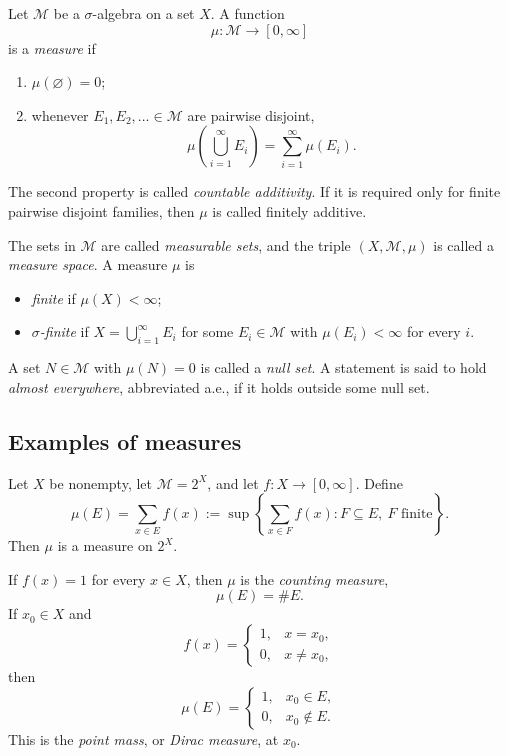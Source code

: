 \begin{definition}[Measure]
  Let $\mathcal M$ be a $\sigma$-algebra on a set $X$. A function
  \[
    \mu\colon\mathcal M\longrightarrow[0,\infty]
  \]
  is a \emph{measure} if
  \begin{enumerate}[label=(\roman*)]
    \item $\mu(\varnothing)=0$;
    \item whenever $E_1,E_2,\ldots\in\mathcal M$ are pairwise disjoint,
      \[
        \mu\left(\bigcup_{i=1}^{\infty}E_i\right)
        =\sum_{i=1}^{\infty}\mu(E_i).
      \]
  \end{enumerate}
  The second property is called \emph{countable additivity}. If it is
  required only for finite pairwise disjoint families, then $\mu$ is
  called finitely additive.
\end{definition}

The sets in $\mathcal M$ are called \emph{measurable sets}, and the
triple $(X,\mathcal M,\mu)$ is called a \emph{measure space}. A measure
$\mu$ is
\begin{itemize}
  \item \emph{finite} if $\mu(X)<\infty$;
  \item \emph{$\sigma$-finite} if
    $X=\bigcup_{i=1}^{\infty}E_i$ for some $E_i\in\mathcal M$ with
    $\mu(E_i)<\infty$ for every $i$.
\end{itemize}

A set $N\in\mathcal M$ with $\mu(N)=0$ is called a \emph{null set}. A
statement is said to hold \emph{almost everywhere}, abbreviated a.e., if
it holds outside some null set.

\subsection{Examples of measures}

\begin{example}
  Let $X$ be nonempty, let $\mathcal M=2^X$, and let
  $f\colon X\to[0,\infty]$. Define
  \[
    \mu(E)=\sum_{x\in E}f(x)
    :=\sup\left\{
      \sum_{x\in F}f(x):F\subseteq E,\ F\text{ finite}
    \right\}.
  \]
  Then $\mu$ is a measure on $2^X$.

  If $f(x)=1$ for every $x\in X$, then $\mu$ is the \emph{counting
  measure},
  \[
    \mu(E)=\#E.
  \]
  If $x_0\in X$ and
  \[
    f(x)=
    \begin{cases}
      1,&x=x_0,\\
      0,&x\neq x_0,
    \end{cases}
  \]
  then
  \[
    \mu(E)=
    \begin{cases}
      1,&x_0\in E,\\
      0,&x_0\notin E.
    \end{cases}
  \]
  This is the \emph{point mass}, or \emph{Dirac measure}, at $x_0$.
\end{example}

